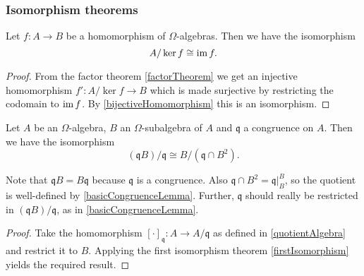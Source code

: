 \subsubsection{Isomorphism theorems}
\begin{theorem} \label{firstIsomorphism}
Let $f:A\to B$ be a homomorphism of $\Omega$-algebras. Then we have the isomorphism
\[ A/\ker f \cong \operatorname{im} f. \]
\end{theorem}
\begin{proof}
From the factor theorem \ref{factorTheorem} we get an injective homomorphism $f': A/\ker f \to B$ which is made surjective by restricting the codomain to $\operatorname{im} f$. By \ref{bijectiveHomomorphism} this is an isomorphism.
\end{proof}

\begin{theorem}
Let $A$ be an $\Omega$-algebra, $B$ an $\Omega$-subalgebra of $A$ and $\mathfrak{q}$ a congruence on $A$. Then we have the isomorphism
\[ (\mathfrak{q}B)/\mathfrak{q} \cong B/(\mathfrak{q}\cap B^2). \]
\end{theorem}
Note that $\mathfrak{q}B = B\mathfrak{q}$ because $\mathfrak{q}$ is a congruence. Also $\mathfrak{q}\cap B^2 = \mathfrak{q}|_B^B$, so the quotient is well-defined by \ref{basicCongruenceLemma}. Further, $\mathfrak{q}$ should really be restricted in $(\mathfrak{q}B)/\mathfrak{q}$, as in \ref{basicCongruenceLemma}.
\begin{proof}
Take the homomorphism $[\cdot]_\mathfrak{q}:A \to A/\mathfrak{q}$ as defined in \ref{quotientAlgebra} and restrict it to $B$. Applying the first isomorphism theorem \ref{firstIsomorphism} yields the required result.
\end{proof}

